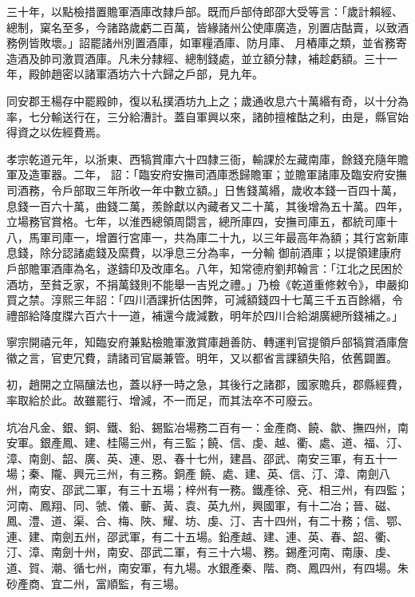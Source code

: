 \begin{pinyinscope}
 三十年，以點檢措置贍軍酒庫改隸戶部。既而戶部侍郎邵大受等言：「歲計賴經、總制，窠名至多，今諸路歲虧二百萬，皆緣諸州公使庫廣造，別置店酤賣，以致酒務例皆敗壞。」詔罷諸州別置酒庫，如軍糧酒庫、防月庫、
 月樁庫之類，並省務寄造酒及帥司激買酒庫。凡未分隸經、總制錢處，並立額分隸，補趁虧額。三十一年，殿帥趙密以諸軍酒坊六十六歸之戶部，見九年。



 同安郡王楊存中罷殿帥，復以私撲酒坊九上之；歲通收息六十萬緡有奇，以十分為率，七分輸送行在，三分給漕計。蓋自軍興以來，諸帥擅榷酤之利，由是，縣官始得資之以佐經費焉。



 孝宗乾道元年，以浙東、西犒賞庫六十四隸三衙，輸課於左藏南庫，餘錢充隨年贍軍及造軍器。二年，
 詔：「臨安府安撫司酒庫悉歸贍軍；並贍軍諸庫及臨安府安撫司酒務，令戶部取三年所收一年中數立額。」日售錢萬緡，歲收本錢一百四十萬，息錢一百六十萬，曲錢二萬，羨餘獻以內藏者又二十萬，其後增為五十萬。四年，立場務官賞格。七年，以淮西總領周閟言，總所庫四，安撫司庫五，都統司庫十八，馬軍司庫一，增置行宮庫一，共為庫二十九，以三年最高年為額；其行宮新庫息錢，除分認諸處錢及縻費，以凈息三分為率，一分輸
 御前酒庫；以提領建康府戶部贍軍酒庫為名，遂鑄印及改庫名。八年，知常德府劉邦翰言：「江北之民困於酒坊，至貧乏家，不捐萬錢則不能舉一吉兇之禮。」乃檢《乾道重修敕令》，申嚴抑買之禁。淳熙三年詔：「四川酒課折估困弊，可減額錢四十七萬三千五百餘緡，令禮部給降度牒六百六十一道，補還今歲減數，明年於四川合給湖廣總所錢補之。」



 寧宗開禧元年，知臨安府兼點檢贍軍激賞庫趙善防、轉運判官提領戶部犒賞酒庫詹
 徽之言，官吏冗費，請諸司官屬兼管。明年，又以都省言課額失陷，依舊闢置。



 初，趙開之立隔釀法也，蓋以紓一時之急，其後行之諸郡，國家贍兵，郡縣經費，率取給於此。故雖罷行、增減，不一而足，而其法卒不可廢云。



 坑冶凡金、銀、銅、鐵、鉛、錫監冶場務二百有一：金產商、饒、歙、撫四州，南安軍。銀產鳳、建、桂陽三州，有三監；饒、信、虔、越、衢、處、道、福、汀、漳、南劍、韶、廣、英、連、恩、春十七州，建昌、邵武、南安三軍，有五十一場；秦、隴、興元三州，有三務。銅產
 饒、處、建、英、信、汀、漳、南劍八州，南安、邵武二軍，有三十五場；梓州有一務。鐵產徐、兗、相三州，有四監；河南、鳳翔、同、虢、儀、蘄、黃、袁、英九州，興國軍，有十二冶；晉、磁、鳳、澧、道、渠、合、梅、陜、耀、坊、虔、汀、吉十四州，有二十務；信、鄂、連、建、南劍五州，邵武軍，有二十五場。鉛產越、建、連、英、春、韶、衢、汀、漳、南劍十州，南安、邵武二軍，有三十六場、務。錫產河南、南康、虔、道、賀、潮、循七州，南安軍，有九場。水銀產秦、階、商、鳳四州，有四場。朱砂產商、宜二州，富順監，有三場。




\end{pinyinscope}
